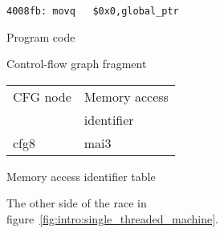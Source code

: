 \begin{figure}
  \begin{minipage}{50mm}
    \begin{subfloat}
      \begin{minipage}{50mm}
\begin{verbatim}
4008fb: movq   $0x0,global_ptr
\end{verbatim}
      \end{minipage}
      \caption{Program code}
    \end{subfloat}
    \vspace{50pt}
    \begin{subfloat}
      \hspace{20mm}
      \caption{Control-flow graph fragment}
    \end{subfloat}
    \begin{subfloat}
      \begin{tabular}{ll}
        CFG node & Memory access \\
                 & identifier \\
        cfg8     & mai3 \\
      \end{tabular}
      \caption{Memory access identifier table}
    \end{subfloat}
  \end{minipage}
  \begin{subfloat}
    \begin{minipage}{30mm}
    \end{minipage}
    \caption{\STateMachine}
  \end{subfloat}
  \label{fig:intro:single_threaded_machine_write}
  \caption{The other side of the race in figure~\ref{fig:intro:single_threaded_machine}.}
\end{figure}

